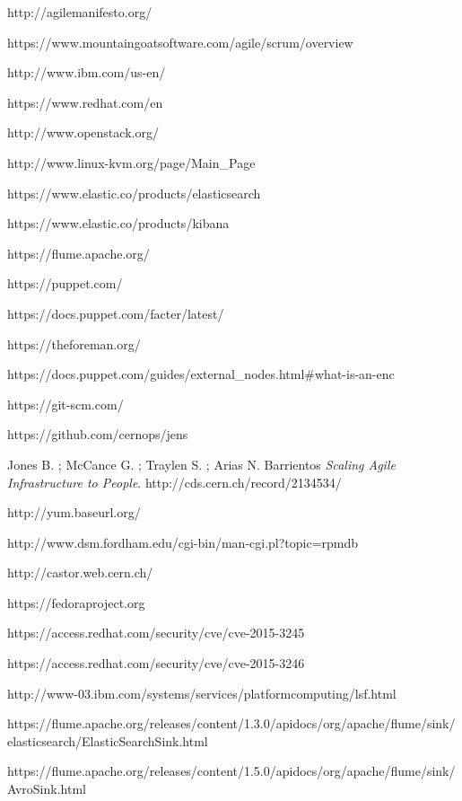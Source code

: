 
\begin{thebibliography}{90}
\rhead[\fancyplain{}{\bfseries \leftmark}]{\fancyplain{}{\bfseries
\thepage}}

http://agilemanifesto.org/

https://www.mountaingoatsoftware.com/agile/scrum/overview

http://www.ibm.com/us-en/

https://www.redhat.com/en

http://www.openstack.org/

http://www.linux-kvm.org/page/Main\_Page

https://www.elastic.co/products/elasticsearch

https://www.elastic.co/products/kibana

https://flume.apache.org/

https://puppet.com/

https://docs.puppet.com/facter/latest/

https://theforeman.org/

https://docs.puppet.com/guides/external\_nodes.html\#what-is-an-enc

https://git-scm.com/

https://github.com/cernops/jens

Jones B. ; McCance G. ; Traylen S. ; Arias N. Barrientos 
\textit{Scaling Agile Infrastructure to People}.
http://cds.cern.ch/record/2134534/

http://yum.baseurl.org/

http://www.dsm.fordham.edu/cgi-bin/man-cgi.pl?topic=rpmdb

http://castor.web.cern.ch/

https://fedoraproject.org

https://access.redhat.com/security/cve/cve-2015-3245

https://access.redhat.com/security/cve/cve-2015-3246

http://www-03.ibm.com/systems/services/platformcomputing/lsf.html

https://flume.apache.org/releases/content/1.3.0/apidocs/org/apache/flume/sink/elasticsearch/ElasticSearchSink.html

https://flume.apache.org/releases/content/1.5.0/apidocs/org/apache/flume/sink/AvroSink.html




\end{thebibliography}
